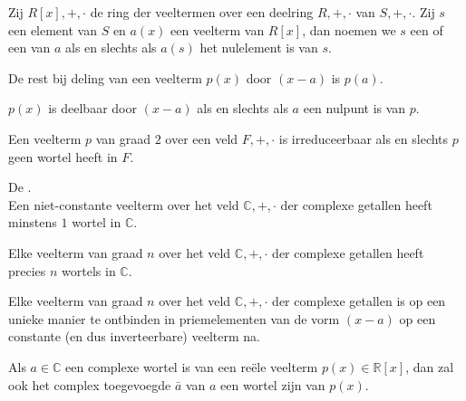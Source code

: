 \documentclass[main.tex]{subfiles}
\begin{document}
\begin{de}
  Zij $R[x],+,\cdot$ de ring der veeltermen over een deelring $R,+,\cdot$ van $S,+,\cdot$.
  Zij $s$ een element van $S$ en $a(x)$ een veelterm van $R[x]$, dan noemen we $s$ een  of een  van $a$ als en slechts als $a(s)$ het nulelement is van $s$.
\end{de}

\begin{st}
  De rest bij deling van een veelterm $p(x)$ door $(x-a)$ is $p(a)$.
\end{st}

\begin{st}
  $p(x)$ is deelbaar door $(x-a)$ als en slechts als $a$ een nulpunt is van $p$.
\end{st}

\begin{st}
  Een veelterm $p$ van graad $2$ over een veld $F,+,\cdot$ is irreduceerbaar als en slechts $p$ geen wortel heeft in $F$.
\end{st}

\begin{st}
  \label{st:fundamentele-stelling-van-de-algebra}
  De .\\
  Een niet-constante veelterm over het veld $\mathbb{C},+,\cdot$ der complexe getallen heeft minstens $1$ wortel in $\mathbb{C}$.
\end{st}
  
\begin{gev}
  Elke veelterm van graad $n$ over het veld $\mathbb{C},+,\cdot$ der complexe getallen heeft precies $n$ wortels in $\mathbb{C}$.
\end{gev}

\begin{gev}
  Elke veelterm van graad $n$ over het veld $\mathbb{C},+,\cdot$ der complexe getallen is op een unieke manier te ontbinden in priemelementen van de vorm $(x-a)$ op een constante (en dus inverteerbare) veelterm na.
\end{gev}

\begin{st}
  Als $a\in \mathbb{C}$ een complexe wortel is van een re\"ele veelterm $p(x)\in \mathbb{R}[x]$, dan zal ook het complex toegevoegde $\bar{a}$ van $a$ een wortel zijn van $p(x)$.
\end{st}
\end{document}
